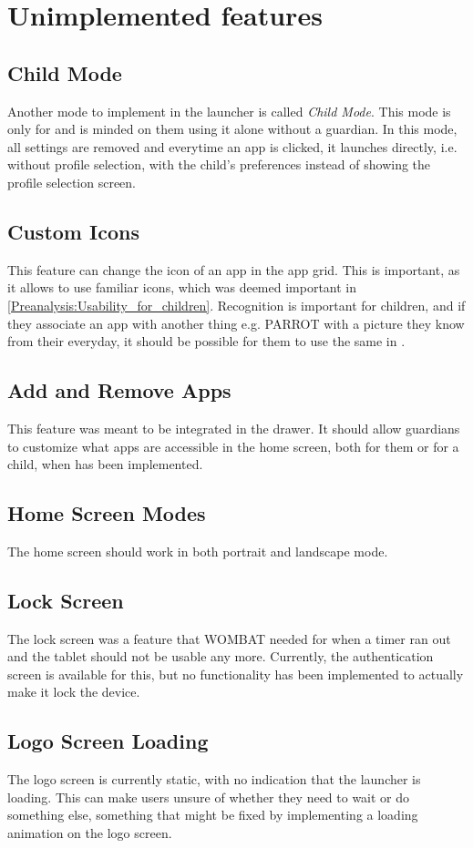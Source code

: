 \section{Unimplemented features}
\label{backlog_unimplemented}

\subsection{Child Mode}
\label{backlog:child_mode}
Another mode to implement in the launcher is called \emph{Child Mode}. 
This mode is only for \autists[] and is minded on them using it alone without a guardian. 
In this mode, all settings are removed and everytime an app is clicked, it launches directly, i.e. without profile selection, with the child's preferences instead of showing the profile selection screen.

\subsection{Custom Icons}
\label{backlog:custom_icons}
This feature can change the icon of an app in the app grid. 
This is important, as it allows \autists[] to use familiar icons, which was deemed important in \autoref{Preanalysis:Usability_for_children}. 
Recognition is important for children, and if they associate an app with another thing e.g. PARROT with a picture they know from their everyday, it should be possible for them to use the same in \giraf[].

\subsection{Add and Remove Apps}
\label{backlog:hide_apps}
This feature was meant to be integrated in the drawer. 
It should allow guardians to customize what apps are accessible in the home screen, both for them or for a child, when  has been implemented. 

\subsection{Home Screen Modes}
\label{backlog:home_screen_modes}
The home screen should work in both portrait and landscape mode.

\subsection{Lock Screen}
\label{backlog:lock_screen}
The lock screen was a feature that WOMBAT needed for when a timer ran out and the tablet should not be usable any more. 
Currently, the authentication screen is available for this, but no functionality has been implemented to actually make it lock the device. 

\subsection{Logo Screen Loading}
\label{backlog:logo_screen_loading}
The logo screen is currently static, with no indication that the launcher is loading. 
This can make users unsure of whether they need to wait or do something else, something that might be fixed by implementing a loading animation on the logo screen.